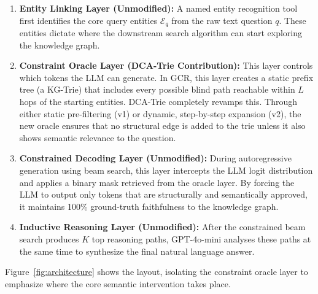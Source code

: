 \begin{enumerate}
  \item \textbf{Entity Linking Layer (Unmodified):} A named entity recognition tool first identifies the core query entities $\mathcal{E}_q$ from the raw text question $q$. These entities dictate where the downstream search algorithm can start exploring the knowledge graph.

  \item \textbf{Constraint Oracle Layer (DCA-Trie Contribution):} This layer controls which tokens the LLM can generate. In GCR, this layer creates a static prefix tree (a KG-Trie) that includes every possible blind path reachable within $L$ hops of the starting entities. DCA-Trie completely revamps this. Through either static pre-filtering (v1) or dynamic, step-by-step expansion (v2), the new oracle ensures that no structural edge is added to the trie unless it also shows semantic relevance to the question.

  \item \textbf{Constrained Decoding Layer (Unmodified):} During autoregressive generation using beam search, this layer intercepts the LLM logit distribution and applies a binary mask retrieved from the oracle layer. By forcing the LLM to output only tokens that are structurally and semantically approved, it maintains 100\% ground-truth faithfulness to the knowledge graph.

  \item \textbf{Inductive Reasoning Layer (Unmodified):} After the constrained beam search produces $K$ top reasoning paths, GPT-4o-mini analyses these paths at the same time to synthesize the final natural language answer.
\end{enumerate}

Figure~\ref{fig:architecture} shows the layout, isolating the constraint oracle layer to emphasize where the core semantic intervention takes place.


